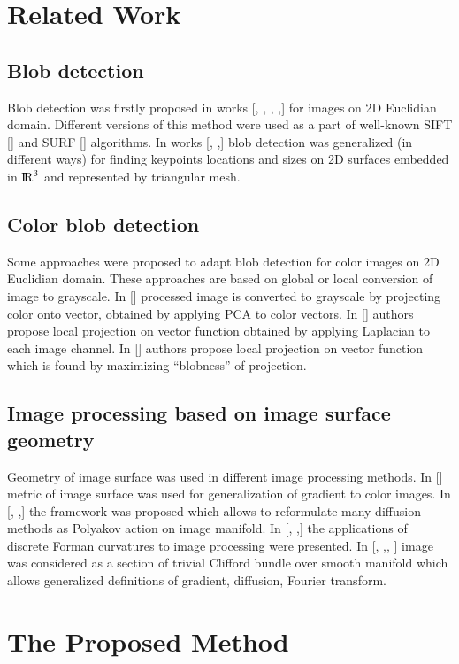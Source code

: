 \documentclass{llncs}
\begin{document}
\section{Related Work}

\subsection{Blob detection}
Blob detection was firstly proposed in works [, , , ,] for images on 2D Euclidian domain. Different versions of this method were used as a part of well-known SIFT [] and SURF [] algorithms. In works [, ,] blob detection was generalized (in different ways) for finding keypoints locations and sizes on 2D surfaces embedded in ${\rm I\!R}^3$ and represented by triangular mesh. 

\subsection{Color blob detection}
Some approaches were proposed to adapt blob detection for color images on 2D Euclidian domain. These approaches are based on global or local conversion of image to grayscale. In [] processed image is converted to grayscale by projecting color onto vector, obtained by applying PCA to color vectors. In [] authors propose local projection on vector function obtained by applying Laplacian to each image channel. In [] authors propose local projection on vector function which is found  by maximizing “blobness” of projection.

\subsection{Image processing based on image surface geometry}
Geometry of image surface was used in different image processing methods. In [] metric of image surface was used for generalization of gradient to color images. In [, ,] the framework was proposed which allows to reformulate many diffusion methods as Polyakov action on image manifold. In [, ,] the applications of discrete Forman curvatures to image processing were presented. In [, ,, ] image was considered as a section of trivial Clifford bundle over smooth manifold which allows generalized definitions of gradient, diffusion, Fourier transform.

\section{The Proposed Method}
\end{document}
